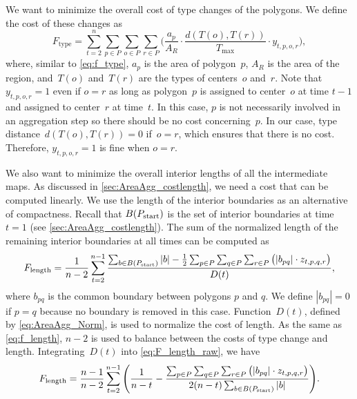 We want to minimize the overall cost of type changes of the 
polygons. 
We define the cost of these changes as
\begin{equation}
\label{eq:F_type}
F_\mathrm{type}=\sum_{t=2}^{n} \sum_{p\in P} \sum_{o\in P} 
\sum_{r\in P}
\bigg( \frac{a_p}{A_R} \cdot
\frac{d(T(o),T(r))}{T_{\max}}\cdot 
y_{t,p,o,r}\bigg),
\end{equation}
where, similar to \eq\ref{eq:f_type}, 
$a_p$ is the area of polygon~$p$,
$A_R$ is the area of the region, 
and~$T(o)$ and~$T(r)$ are the types of centers~$o$ and~$r$.
Note that~$y_{t,p,o,r}=1$ even if $o=r$
as long as polygon~$p$ is assigned to center~$o$ at time $t-1$
and assigned to center~$r$ at time~$t$.
In this case, $p$ is not necessarily involved in an aggregation 
step so there should be no cost concerning~$p$.
In our case, type distance~$d(T(o),T(r))=0$ if~$o=r$,
which ensures that there is no cost.
Therefore, $y_{t,p,o,r}=1$ is fine when $o=r$. 


We also want to minimize the overall interior lengths of all the 
intermediate maps.
As discussed in \sect\ref{sec:AreaAgg_costlength},
we need a cost that can be computed linearly.
We use the length of the interior boundaries 
as an alternative of compactness.
Recall that $B(P_\mathrm{start})$ is the set of interior boundaries 
at time $t=1$ (see \sect\ref{sec:AreaAgg_costlength}).
The sum of the normalized length of the remaining interior 
boundaries at all 
times can be 
computed as
\begin{equation}
\label{eq:F_length_raw}
F_\mathrm{length}
=\frac{1}{n-2} \sum_{t=2}^{n-1} 
\frac{\sum_{b\in B (P_\mathrm{start})} |b| - 
	\frac{1}{2} \sum_{p \in P}\sum_{q \in P}\sum_{r \in P} 
	\big(|b_{pq}|\cdot z_{t,p,q,r}\big)}
{D(t)},
\end{equation}
where $b_{pq}$ is the common boundary 
between polygons $p$ and $q$. 
We define $|b_{pq}|=0$ if $p=q$ 
because no boundary is removed in this case.
Function~$D(t)$, defined by \eq\ref{eq:AreaAgg_Norm}, 
is used to normalize the cost of length.
As the same as \eq\ref{eq:f_length}, 
$n-2$ is used to balance 
between the costs of type change and length.
Integrating~$D(t)$ into \eq\ref{eq:F_length_raw}, we have
\begin{equation}
\label{eq:F_length}
F_\mathrm{length}
=\frac{n-1}{n-2} \sum_{t=2}^{n-1}
\Bigg(
\frac{1}{n-t} -
\frac{\sum_{p \in P}\sum_{q \in P}\sum_{r \in P} 
	\big(|b_{pq}|\cdot z_{t,p,q,r}\big)}
{2(n-t)\sum_{b\in B (P_\mathrm{start})} |b| }
\Bigg).
\end{equation}




